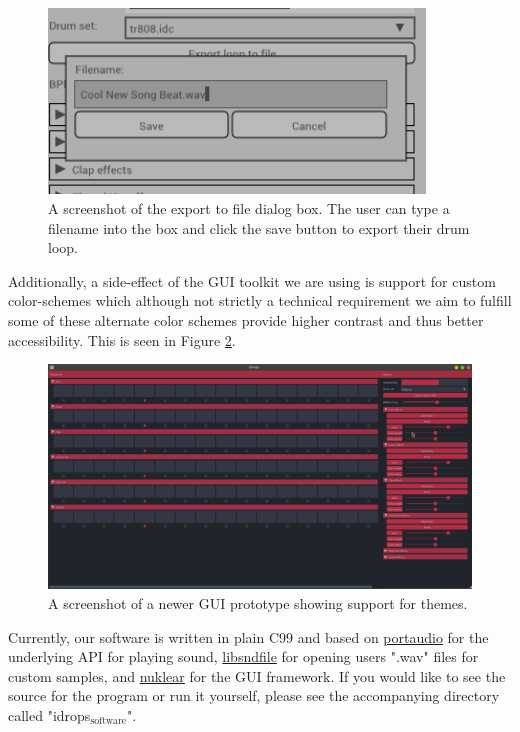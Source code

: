 \documentclass[11pt]{article}
\begin{document}
\begin{figure}[htbp]
\centering
\includegraphics[width=10cm]{./file_export.png}
\caption{\label{fig:org988a589}
A screenshot of the export to file dialog box. The user can type a filename into the box and click the save button to export their drum loop.}
\end{figure}

Additionally, a side-effect of the GUI toolkit we are using is support
for custom color-schemes which although not strictly a technical
requirement we aim to fulfill some of these alternate color schemes
provide higher contrast and thus better accessibility. This is seen
in Figure \ref{fig:orga7cc4b1}.


\begin{figure}[htbp]
\centering
\includegraphics[width=15cm]{./GUI_2.png}
\caption{\label{fig:orga7cc4b1}
A screenshot of a newer GUI prototype showing support for themes.}
\end{figure}

Currently, our software is written in plain C99 and based on
\href{http://www.portaudio.com/}{portaudio} for the underlying API for playing sound, \href{http://www.mega-nerd.com/libsndfile/}{libsndfile} for
opening users ".wav" files for custom samples, and \href{https://github.com/Immediate-Mode-UI/Nuklear}{nuklear} for the GUI
framework. If you would like to see the source for the program or run it
yourself, please see the accompanying directory called "idrops\(_{\text{software}}\)".
\end{document}
